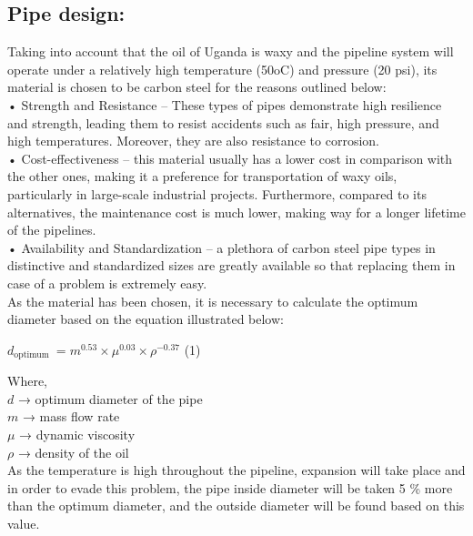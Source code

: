 \documentclass[12pt]{article}
\begin{document}
      \subsection{Pipe design: }
      {\fontsize{12pt}{12pt}

      \hspace*{1em} Taking into account that the oil of Uganda is waxy and the pipeline system will operate under a relatively high temperature (50oC) and pressure (20 psi), its material is chosen to be carbon steel for the reasons outlined below: \\
      \hspace*{1em}• 	Strength and Resistance – These types of pipes demonstrate high resilience and strength, leading them to resist accidents such as fair, high pressure, and high temperatures. Moreover, they are also resistance to corrosion. \\
      \hspace*{1em}• 	Cost-effectiveness – this material usually has a lower cost in comparison with the other ones, making it a preference for transportation of waxy oils, particularly in large-scale industrial projects. Furthermore, compared to its alternatives, the maintenance cost is much lower, making way for a longer lifetime of the pipelines. \\
      \hspace*{1em}• 	Availability and Standardization – a plethora of carbon steel pipe types in distinctive and standardized sizes are greatly available so that replacing them in case of a problem is extremely easy. \\
      \hspace*{1em}As the material has been chosen, it is necessary to calculate the optimum diameter based on the equation illustrated below:
      \begin{center}
        $d_{\text {optimum }}=m^{0.53} \times \mu^{0.03} \times \rho^{-0.37}$ (1)


        
      \end{center}

      Where, \\
      \hspace*{1em}$d$ → optimum diameter of the pipe \\
      \hspace*{1em}$m$ → mass flow rate \\
      \hspace*{1em}$\mu$ → dynamic viscosity \\
      \hspace*{1em}$\rho$ → density of the oil \\

      As the temperature is high throughout the pipeline, expansion will take place and in order to evade this problem, the pipe inside diameter will be taken 5 \% more than the optimum diameter, and the outside diameter will be found based on this value.
      }
\end{document}
